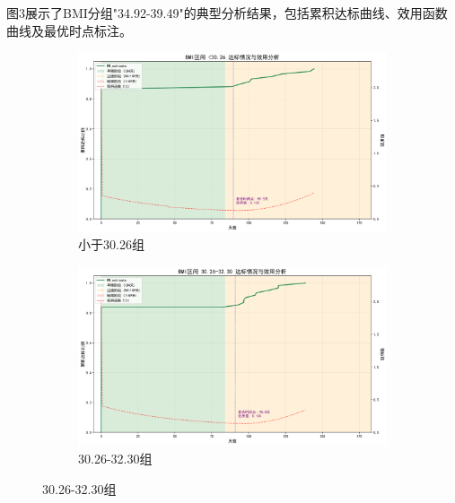 \documentclass{article}
\begin{document}
图3展示了BMI分组"34.92-39.49"的典型分析结果，包括累积达标曲线、效用函数曲线及最优时点标注。
\begin{figure}[H]
    \centering
    \begin{subfigure}[b]{0.35\textwidth}  %
        \centering
        \includegraphics[width=\textwidth]{graph/BMI_lt30.26_utility_analysis.png}  %
        \caption{小于30.26组}  %
        \label{fig:sub1}  %
    \end{subfigure}
    \hspace{0.05\textwidth}  %
    \begin{subfigure}[b]{0.35\textwidth}
        \centering
        \includegraphics[width=\textwidth]{graph/BMI_30.26_32.30_utility_analysis.png}
        \caption{30.26-32.30组}
        \label{fig:sub2}
    \end{subfigure}
    \label{fig:two}  %
\end{figure}
\end{document}
